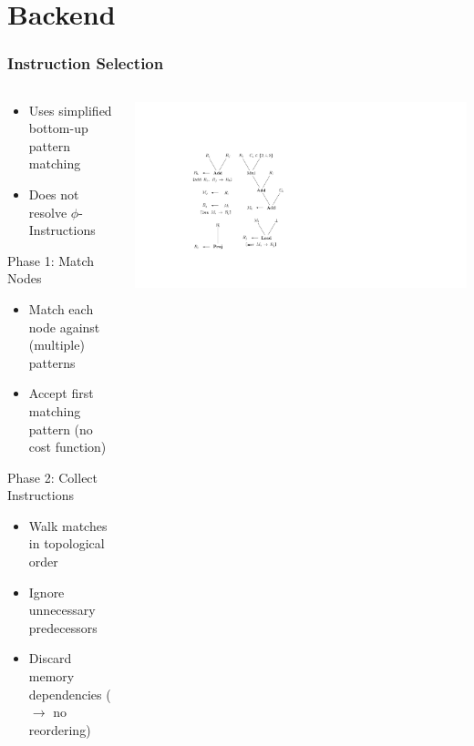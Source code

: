 \documentclass[navbaroff,en]{sdqbeamer}
\begin{document}
\section{Backend}

\begin{frame}
	\frametitle{Instruction Selection}
	\begin{columns}
		\begin{column}{0.55\textwidth}
			\begin{itemize}
				\item Uses simplified bottom-up pattern matching
				\item Does not resolve $\phi$-Instructions
			\end{itemize}

			\vspace{1em}

			\begin{contentblock}{Phase 1: Match Nodes}
				\begin{itemize}
					\item Match each node against (multiple) patterns
					\item Accept first matching pattern (no cost function)
				\end{itemize}
			\end{contentblock}

			\begin{contentblock}{Phase 2: Collect Instructions}
				\begin{itemize}
					\item Walk matches in topological order
					\item Ignore unnecessary predecessors
					\item Discard memory dependencies ($\rightarrow$ no reordering)
				\end{itemize}
			\end{contentblock}
		\end{column}
		\begin{column}{0.44\textwidth}
		 	\centering \includegraphics[scale=0.4]{images/pattern.ipe.pdf}
		\end{column}
	\end{columns}

\end{frame}
\end{document}
